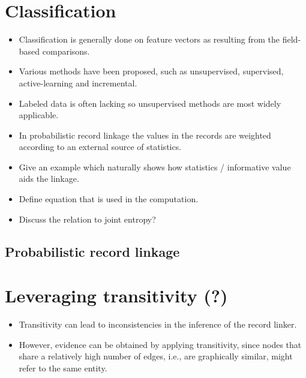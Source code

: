 

\section{Classification}
\label{sec:classification}

\begin{itemize}
    \item Classification is generally done on feature vectors as resulting from the field-based comparisons.
    \item Various methods have been proposed, such as unsupervised, supervised, active-learning and incremental.
    \item Labeled data is often lacking so unsupervised methods are most widely applicable.
    \item In probabilistic record linkage the values in the records are weighted according to an external source of statistics.
    \item Give an example which naturally shows how statistics / informative value aids the linkage.
    \item Define equation that is used in the computation.
    \item Discuss the relation to joint entropy?
\end{itemize}




\subsection{Probabilistic record linkage}
\begin{itemize}
    
\end{itemize}





\section{Leveraging transitivity (?)}
\begin{itemize}
    \item Transitivity can lead to inconsistencies in the inference of the record linker.
    \item However, evidence can be obtained by applying transitivity, since nodes that share a relatively high number of edges, i.e., are graphically similar, might refer to the same entity.
\end{itemize}


